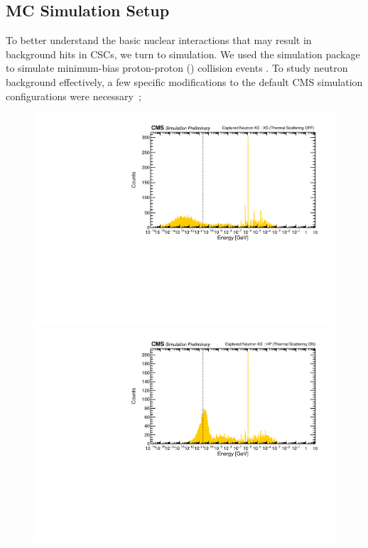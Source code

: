 \subsection{\GEANTfour MC Simulation Setup}
To better understand the basic nuclear interactions that may result in background hits in CSCs, we turn to simulation. We used the \GEANTfour simulation package to simulate minimum-bias proton-proton (\pp) collision events \cite{Agostinelli:2002hh,Allison:2006ve,Allison:2016lfl,Sjostrand:2006za}. To study neutron background effectively, a few specific modifications to the default CMS simulation configurations were necessary~\cite{PietsPage};

\begin{figure}[htbp]
	\centering
	\includegraphics[width=\dummyFigWidth]{figures/neutron/neutronSpectrum_before.pdf}\\
	\includegraphics[width=\dummyFigWidth]{figures/neutron/neutronSpectrum_after.pdf}

\end{figure}
